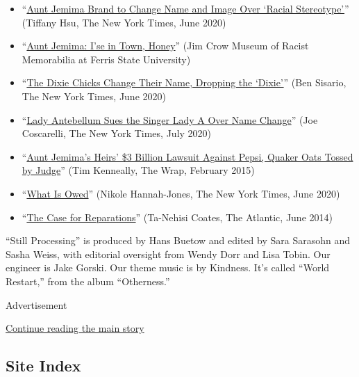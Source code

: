\begin{itemize}
\item
  ``\href{https://www.nytimes3xbfgragh.onion/2020/06/17/business/media/aunt-jemima-racial-stereotype.html}{Aunt
  Jemima Brand to Change Name and Image Over `Racial Stereotype'}''
  (Tiffany Hsu, The New York Times, June 2020)
\item
  ``\href{https://youtu.be/3ipamH6EEwI}{Aunt Jemima: I'se in Town,
  Honey}'' (Jim Crow Museum of Racist Memorabilia at Ferris State
  University)
\item
  ``\href{https://www.nytimes3xbfgragh.onion/2020/06/25/arts/music/dixie-chicks-change-name.html}{The
  Dixie Chicks Change Their Name, Dropping the `Dixie'}'' (Ben Sisario,
  The New York Times, June 2020)
\item
  ``\href{https://www.nytimes3xbfgragh.onion/2020/07/08/arts/music/lady-antebellum-lady-a-lawsuit.html}{Lady
  Antebellum Sues the Singer Lady A Over Name Change}'' (Joe Coscarelli,
  The New York Times, July 2020)
\item
  ``\href{https://www.thewrap.com/aunt-jemima-3-billion-lawsuit-against-pepsi-quaker-oats-tossed-by-judge/}{Aunt
  Jemima's Heirs' \$3 Billion Lawsuit Against Pepsi, Quaker Oats Tossed
  by Judge}'' (Tim Kenneally, The Wrap, February 2015)
\item
  ``\href{https://www.nytimes3xbfgragh.onion/interactive/2020/06/24/magazine/reparations-slavery.html}{What
  Is Owed}'' (Nikole Hannah-Jones, The New York Times, June 2020)
\item
  ``\href{https://www.theatlantic.com/magazine/archive/2014/06/the-case-for-reparations/361631/?gclid=EAIaIQobChMIprGKz6bQ6gIVStbACh14Vgv2EAAYASAAEgJ6gPD_BwE}{The
  Case for Reparations}'' (Ta-Nehisi Coates, The Atlantic, June 2014)
\end{itemize}

``Still Processing'' is produced by Hans Buetow and edited by Sara
Sarasohn and Sasha Weiss, with editorial oversight from Wendy Dorr and
Lisa Tobin. Our engineer is Jake Gorski. Our theme music is by Kindness.
It's called ``World Restart,'' from the album ``Otherness.''

Advertisement

\protect\hyperlink{after-bottom}{Continue reading the main story}

\hypertarget{site-index}{%
\subsection{Site Index}\label{site-index}}

